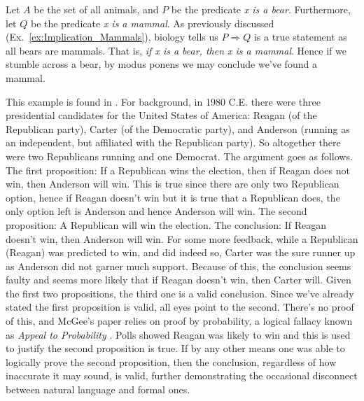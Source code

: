         \begin{example}
            Let $A$ be the set of all animals, and $P$ be the predicate
            \textit{x is a bear}. Furthermore, let $Q$ be the predicate
            \textit{x is a mammal}. As previously discussed
            (Ex.~\ref{ex:Implication_Mammals}), biology tells us
            $P\Rightarrow{Q}$ is a true statement as all bears are mammals. That
            is, \textit{if x is a bear, then x is a mammal}. Hence if we stumble
            across a bear, by modus ponens we may conclude we've found a mammal.
        \end{example}
        \begin{example}
            This example is found in \cite{McGee1985ModusPonens}. For
            background, in 1980 C.E. there were three presidential candidates
            for the United States of America: Reagan (of the Republican party),
            Carter (of the Democratic party), and Anderson (running as an
            independent, but affiliated with the Republican party). So
            altogether there were two Republicans running and one Democrat. The
            argument goes as follows. The first proposition: If a Republican
            wins the election, then if Reagan does not win, then Anderson will
            win. This is true since there are only two Republican option, hence
            if Reagan doesn't win but it is true that a Republican does, the
            only option left is Anderson and hence Anderson will win. The second
            proposition: A Republican will win the election. The conclusion: If
            Reagan doesn't win, then Anderson will win. For some more feedback,
            while a Republican (Reagan) was predicted to win, and did indeed so,
            Carter was the sure runner up as Anderson did not garner much
            support. Because of this, the conclusion seems faulty and seems more
            likely that if Reagan doesn't win, then Carter will. Given the first
            two propositions, the third one is a valid conclusion. Since we've
            already stated the first proposition is valid, all eyes point to the
            second. There's no proof of this, and McGee's paper relies on proof
            by probability, a logical fallacy known as
            \textit{Appeal to Probability}%
            . Polls showed Reagan was likely to win
            and this is used to justify the second proposition is true. If by
            any other means one was able to logically prove the second
            proposition, then the conclusion, regardless of how inaccurate it
            may sound, is valid, further demonstrating the occasional disconnect
            between natural language and formal ones.
        \end{example}
